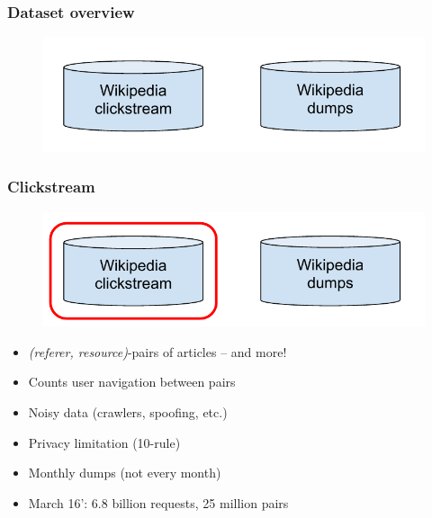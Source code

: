 \begin{frame}
  \frametitle{Dataset overview}
  
  \begin{figure}[tbph]
    \centering
    \includegraphics[width=0.7\linewidth]{images/datasets}
  \end{figure}
  
\end{frame}

\begin{frame}
  \frametitle{Clickstream}
  \begin{figure}[tbph]
    \centering
    \includegraphics[width=0.7\linewidth]{images/datasets_wc}
  \end{figure}
  
  \begin{itemize}
    \item \textit{(referer, resource)}-pairs of articles -- and more!
    \item Counts user navigation between pairs
    \item Noisy data (crawlers, spoofing, etc.)
    \item Privacy limitation (10-rule)
    \item Monthly dumps (not every month)
    \item March 16': 6.8 billion requests, 25 million pairs
  \end{itemize}
  
\end{frame}

